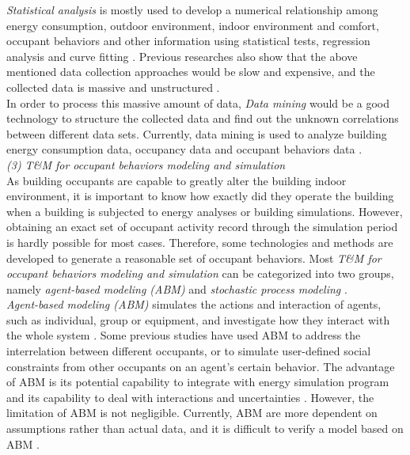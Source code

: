 \documentclass[a4paper, oneside]{discothesis}
\begin{document}
			\textit{Statistical analysis} is mostly used to develop a numerical relationship among energy consumption, outdoor environment, indoor environment and comfort, occupant behaviors and other information using statistical tests, regression analysis and curve fitting \cite{ZOU2018165}. Previous researches also show that the above mentioned data collection approaches would be slow and expensive, and the collected data is massive and unstructured \cite{liang2016occupancy}.\\

			In order to process this massive amount of data, \textit{Data mining} would be a good technology to structure the collected data and find out the unknown correlations between different data sets. Currently, data mining is used to analyze building energy consumption data, occupancy data and occupant behaviors data \cite{xiao2014data}.\\

			\textit{(3) T\&M for occupant behaviors modeling and simulation}\\
			As building occupants are capable to greatly alter the building indoor environment, it is important to know how exactly did they operate the building when a building is subjected to energy analyses or building simulations. However, obtaining an exact set of occupant activity record through the simulation period is hardly possible for most cases. Therefore, some technologies and methods are developed to generate a reasonable set of occupant behaviors. Most \textit{T\&M for occupant behaviors modeling and simulation} can be categorized into two groups, namely \textit{agent-based modeling (ABM)} and \textit{stochastic process modeling} \cite{ZOU2018165}.\\

			\textit{Agent-based modeling (ABM)} simulates the actions and interaction of agents, such as individual, group or equipment, and investigate how they interact with the whole system \cite{jia2017occupancy}. Some previous studies have used ABM to address the interrelation between different occupants, or to simulate user-defined social constraints from other occupants on an agent's certain behavior. The advantage of ABM is its potential capability to integrate with energy simulation program and its capability to deal with interactions and uncertainties \cite{ZOU2018165}. However, the limitation of ABM is not negligible. Currently, ABM are more dependent on assumptions rather than actual data, and it is difficult to verify a model based on ABM \cite{ZOU2018165,jia2017occupancy}. \\
\end{document}
